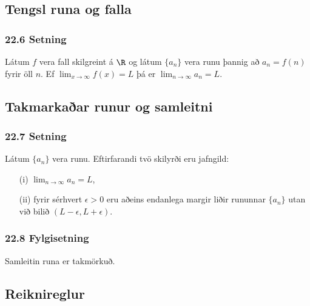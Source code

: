 \subsection[t]{Tengsl runa og falla}
 \subsubsection{22.6 Setning} 
Látum $f$ vera fall skilgreint á $\R$ og látum $\{a_n\}$ vera runu
þannig að $a_n=f(n)$ fyrir öll $n$.   Ef $\lim_{x\rightarrow
  \infty}f(x)=L$ þá er $\lim_{n\rightarrow\infty}a_n=L$.
 


\subsection[t]{Takmarkaðar runur og samleitni}
 \subsubsection{22.7 Setning}  
Látum $\{a_n\}$ vera runu.  Eftirfarandi tvö skilyrði eru jafngild:

\begin{itemize}
\item[(i)]  $\lim_{n\rightarrow\infty}a_n=L$, \pause
\item[(ii)] fyrir sérhvert $\epsilon>0$ eru aðeins endanlega margir
  liðir rununnar $\{a_n\}$ utan við bilið $(L-\epsilon, L+\epsilon)$.
 \end{itemize}
 

\pause

 \subsubsection{22.8 Fylgisetning} 
Samleitin runa er takmörkuð. 


\subsection[t]{Reiknireglur}
